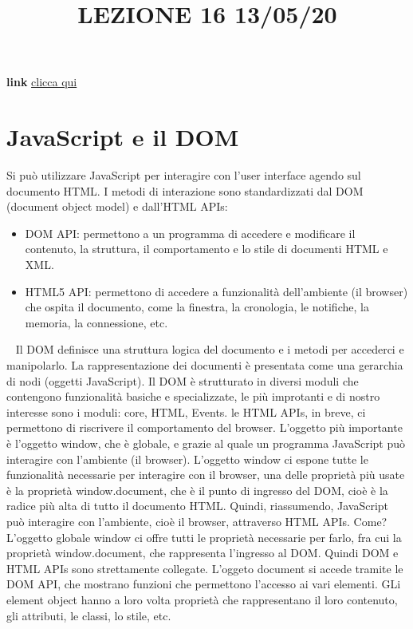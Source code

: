 \title{LEZIONE 16 13/05/20}
\textbf{link} \href{https://web.microsoftstream.com/video/5539d88f-c229-4790-acbc-d3ce4660da70?list=user&userId=cfe0965d-9a7c-40e2-be6e-f078296a1914}{clicca qui}
\section{JavaScript e il DOM}
Si può utilizzare JavaScript per interagire con l'user interface agendo sul documento HTML.\newline
\newline
I metodi di interazione sono standardizzati dal DOM (document object model) e dall'HTML APIs:
\begin{itemize}
    \item DOM API: permettono a un programma di accedere e modificare il contenuto, la struttura, il comportamento e lo stile di documenti HTML e XML.
    \item HTML5 API: permettono di accedere a funzionalità dell'ambiente (il browser) che ospita il documento, come la finestra, la cronologia, le notifiche, la memoria, la connessione, etc.
\end{itemize}
\ \newline
Il DOM definisce una struttura logica del documento e i metodi per accederci e manipolarlo.\newline
La rappresentazione dei documenti è presentata come una gerarchia di nodi (oggetti JavaScript).\newline
Il DOM è strutturato in diversi moduli che contengono funzionalità basiche e specializzate, le più improtanti e di nostro interesse sono i moduli: core, HTML, Events.\newline
\newline
le HTML APIs, in breve, ci permettono di riscrivere il comportamento del browser.\newline
L'oggetto più importante è l'oggetto window, che è globale, e grazie al quale un programma JavaScript può interagire con l'ambiente (il browser). L'oggetto window ci espone tutte le funzionalità necessarie per interagire con il browser, una delle proprietà più usate è la proprietà window.document, che è il punto di ingresso del DOM, cioè è la radice più alta di tutto il documento HTML.\newline
\newline
Quindi, riassumendo, JavaScript può interagire con l'ambiente, cioè il browser, attraverso HTML APIs. Come? L'oggetto globale window ci offre tutti le proprietà necessarie per farlo, fra cui la proprietà window.document, che rappresenta l'ingresso al DOM. Quindi DOM e HTML APIs sono strettamente collegate. L'oggeto document si accede tramite le DOM API, che mostrano funzioni che permettono l'accesso ai vari elementi. GLi element object hanno a loro volta proprietà che rappresentano il loro contenuto, gli attributi, le classi, lo stile, etc.\newline
